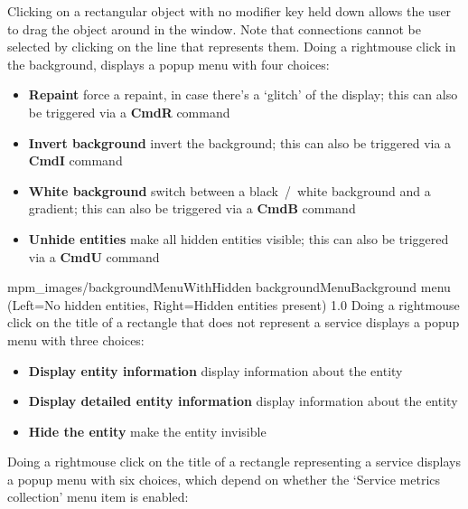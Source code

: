 Clicking on a rectangular object with no modifier key held down allows the user to drag
the object around in the window.
Note that connections cannot be selected by clicking on the line that represents them.
\clearpage
Doing a right\longDash{}mouse click in the background, displays a popup menu with four
choices:
\begin{itemize}
\item\textbf{Repaint} force a repaint, in case there's a `glitch' of the display; this
can also be triggered via a \textbf{Cmd\longDash{}R} command
\item\exSp\textbf{Invert background} invert the background; this can also be triggered via
a \textbf{Cmd\longDash{}I} command
\item\exSp\textbf{White background} switch between a black~/~white background and a
gradient; this can also be triggered via a \textbf{Cmd\longDash{}B} command
\item\exSp\textbf{Unhide entities} make all hidden entities visible; this can also be
triggered via a \textbf{Cmd\longDash{}U} command
\end{itemize}
%
{mpm_images/backgroundMenuWithHidden}%
{backgroundMenu}{Background menu (Left=No hidden entities, Right=Hidden
entities present)}%
{1.0}
Doing a right\longDash{}mouse click on the title of a rectangle that does not represent a
service displays a popup menu with three choices:
\begin{itemize}
\item\textbf{Display entity information} display information about the entity
\item\exSp\textbf{Display detailed entity information} display information about the
entity
\item\exSp\textbf{Hide the entity} make the entity invisible
\end{itemize}
\clearpage
Doing a right\longDash{}mouse click on the title of a rectangle representing a service
displays a popup menu with six choices, which depend on whether the `Service metrics
collection' menu item is enabled:

